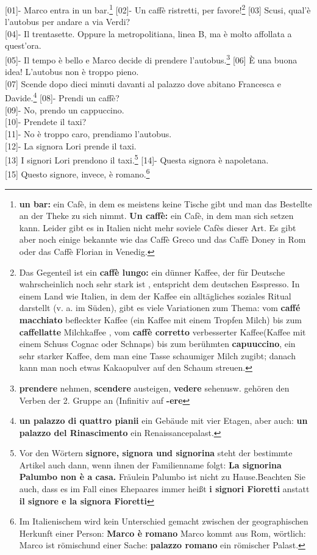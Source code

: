 \documentclass{article}
\begin{document}
{[01]}- Marco entra in un bar.\footnote{\textbf{un bar:} ein Cafè,
in dem es meistens keine Tische gibt und man das Bestellte an der Theke zu
sich nimmt. \textbf{Un caffè:} ein Cafè, in dem man sich setzen kann. Leider
gibt es in Italien nicht mehr soviele Cafès dieser Art. Es gibt aber noch
einige bekannte wie das Caffè Greco und das Caffè Doney in Rom oder das Caffè
Florian in Venedig.}
{[02]}- Un caffè ristretti, per favore!\footnote{Das Gegenteil ist ein \textbf{caffè
lungo:} ein dünner Kaffee, der für Deutsche wahrscheinlich noch sehr stark ist
, entspricht dem deutschen \glqq Esspresso\grqq. In einem Land wie Italien, in dem
der Kaffee ein alltägliches soziales Ritual darstellt (v. a. im Süden), gibt es
viele Variationen zum Thema: vom \textbf{caffé macchiato} \glqq befleckter Kaffee\grqq
(ein Kaffee mit einem Tropfen Milch) bis zum \textbf{caffellatte} \glqq Milchkaffee
\grqq, vom \textbf{caffè corretto} \glqq verbesserter Kaffee\grqq (Kaffee mit einem
Schuss Cognac oder Schnaps) bis zum berühmten \textbf{capuuccino}, ein sehr
starker Kaffee, dem man eine Tasse schaumiger Milch zugibt; danach kann man
noch etwas Kakaopulver auf den Schaum streuen.}
{[03]} Scusi, qual'è l'autobus per andare a via Verdi?\\
{[04]}- Il trentasette. Oppure la metropolitiana, linea B, ma è molto affollata
a quest'ora.\\
{[05]}- Il tempo è bello e Marco decide di prendere l'autobus.\footnote{\textbf{
    prendere} \glqq nehmen\grqq, \textbf{scendere} \glqq austeigen\grqq, \textbf{vedere} \glqq
sehen\grqq usw. gehören den Verben der 2. Gruppe an (Infinitiv auf \textbf{-ere}}
{[06]} È una buona idea! L'autobus non è troppo pieno.\\
{[07]} Scende dopo dieci minuti davanti al palazzo dove abitano Francesca e
Davide.\footnote{\textbf{un palazzo di quattro pianii} \glqq ein Gebäude mit vier
Etagen\grqq, aber auch: \textbf{un palazzo del Rinascimento}
\glqq ein Renaissancepalast\grqq.}
{[08]}- Prendi un caffè?\\
{[09]}- No, prendo un cappuccino.\\
{[10]}- Prendete il taxi?\\
{[11]}- No è troppo caro, prendiamo l'autobus.\\
{[12]}- La signora Lori prende il taxi.\\
{[13]} I signori Lori prendono il taxi.\footnote{Vor den Wörtern \textbf{signore,
signora und signorina} steht der bestimmte Artikel auch dann, wenn ihnen der
Familienname folgt: \textbf{La signorina Palumbo non è a casa.} \glqq Fräulein
Palumbo ist nicht zu Hause.\grqq Beachten Sie auch, dass es im Fall eines
Ehepaares immer heißt \textbf{i signori Fioretti} anstatt \textbf{il signore e
la signora Fioretti}}
{[14]}- Questa signora è napoletana.\\
{[15]} Questo signore, invece, è romano.\footnote{Im Italienischem wird kein
Unterschied gemacht zwischen der geographischen Herkunft einer Person: \textbf{
Marco è romano} \glqq Marco kommt aus Rom, wörtlich: \glqq Marco ist römisch\grqq und
einer Sache: \textbf{palazzo romano} \glqq ein römischer Palast\grqq.}
\end{document}
